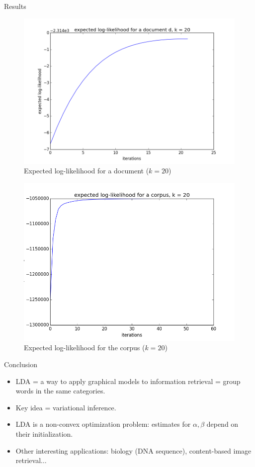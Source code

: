 \documentclass[final]{beamer}
\newlength{\onecolwid}
\begin{document}
\begin{frame}[t]
\begin{columns}[t]
\begin{column}{\onecolwid}
\begin{block}{Results}
\begin{figure}[ht!]
\begin{center}
\includegraphics[width=0.7\linewidth]{../img/k=20/log_likelihood_document_k=20.png}
\caption{Expected log-likelihood for a document ($k=20$)}
\end{center}
\end{figure}

\begin{figure}[ht!]
\begin{center}
\includegraphics[width=0.7\linewidth]{../img/k=20/log_likelihood_corpus_k=20.png}
\caption{Expected log-likelihood for the corpus ($k=20$)}
\end{center}
\end{figure}
\end{block}

\begin{block}{Conclusion}
\begin{itemize}
  \item LDA = a way to apply graphical models to information retrieval = group words in the same categories. 
  \item Key idea = variational inference. 
  \item LDA is a non-convex optimization problem: estimates for $\alpha, \beta$ depend on their initialization.
  \item Other interesting applications: biology (DNA sequence), content-based image retrieval$\ldots$
\end{itemize}
\end{block}


\end{column}
\end{columns}
\end{frame}
\end{document}
